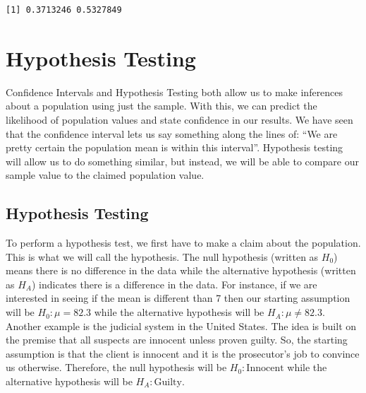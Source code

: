 \documentclass[
  letterpaper,
  DIV=11,
  numbers=noendperiod]{scrreprt}
\begin{document}
\begin{verbatim}
[1] 0.3713246 0.5327849
\end{verbatim}


\chapter{Hypothesis Testing}\label{hypothesis-testing}

Confidence Intervals and Hypothesis Testing both allow us to make
inferences about a population using just the sample. With this, we can
predict the likelihood of population values and state confidence in our
results. We have seen that the confidence interval lets us say something
along the lines of: ``We are pretty certain the population mean is
within this interval''. Hypothesis testing will allow us to do something
similar, but instead, we will be able to compare our sample value to the
claimed population value.

\section{Hypothesis Testing}\label{hypothesis-testing-1}

To perform a hypothesis test, we first have to make a claim about the
population. This is what we will call the hypothesis. The null
hypothesis (written as \(H_0\)) means there is no difference in the data
while the alternative hypothesis (written as \(H_A\)) indicates there is
a difference in the data. For instance, if we are interested in seeing
if the mean is different than 7 then our starting assumption will be
\(H_0: \mu= 82.3\) while the alternative hypothesis will be
\(H_A: \mu \neq 82.3\). Another example is the judicial system in the
United States. The idea is built on the premise that all suspects are
innocent unless proven guilty. So, the starting assumption is that the
client is innocent and it is the prosecutor's job to convince us
otherwise. Therefore, the null hypothesis will be
\(H_0: \text{Innocent}\) while the alternative hypothesis will be
\(H_A: \text{Guilty}\).
\end{document}

